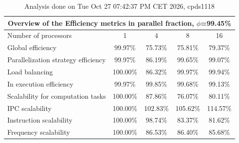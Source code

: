 \begin{table}[h]
\begin{center}
\begin{tabular}{|l|c|c|c|c|}
\hline
\multicolumn{5}{|c|}{Overview of the Efficiency metrics in parallel fraction, $\phi$=99.45\%} \\
\hline
\hline
Number of processors & 1 & 4 & 8 & 16 \\
\hline
\hline
Global efficiency                      &     99.97\% &     75.73\% &     75.81\% &     79.37\% \\
\hline
\hline
Parallelization strategy efficiency &     99.97\% &     86.19\% &     99.65\% &     99.07\% \\
\hline
Load balancing                   &    100.00\% &     86.32\% &     99.97\% &     99.94\% \\
In execution efficiency          &     99.97\% &     99.85\% &     99.68\% &     99.13\% \\
\hline
\hline
Scalability for computation tasks   &    100.00\% &     87.86\% &     76.07\% &     80.11\% \\
\hline
IPC scalability                  &    100.00\% &    102.83\% &    105.62\% &    114.57\% \\
Instruction scalability          &    100.00\% &     98.74\% &     83.37\% &     81.62\% \\
Frequency scalability            &    100.00\% &     86.53\% &     86.40\% &     85.68\% \\
\hline
\end{tabular}
\end{center}
\caption{ Analysis done on Tue Oct 27 07:42:37 PM CET 2026, cpds1118}
\end{table}
